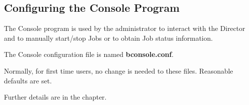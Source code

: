 % 

\subsection{Configuring the Console Program}


The Console program is used by the administrator to interact with the Director
and to manually start/stop Jobs or to obtain Job status information.

The Console configuration file is named {\bf bconsole.conf}.

Normally, for first time users, no change is needed to these files. Reasonable
defaults are set.

Further details are in the
 chapter.

% 
% 
% 
% 
% 

